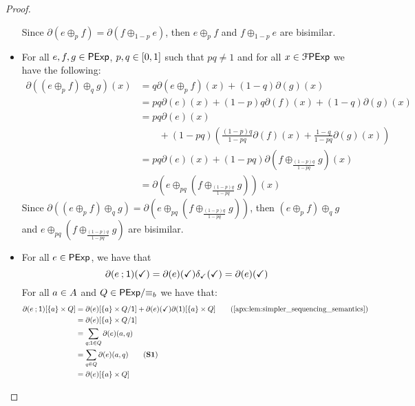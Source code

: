 \begin{proof}
\begin{itemize}[leftmargin=0em]
        Since $\partial(e \oplus_p f) = \partial(f \oplus_{1-p} e )$, then $e \oplus_p f$ and $f \oplus_{1-p} e$ are bisimilar.

        \item[] 
        For all $e,f,g  \in \mathsf{PExp}$, $p,q \in \interval{0}{1}$ such that $pq \neq 1$ and for all $x \in\mathcal{F} \mathsf{PExp}$ we have the following:
        \begin{align*}
            \partial\left((e \oplus_p f) \oplus_{q} g \right)(x) &= q\partial(e \oplus_p f)(x) + (1-q) \partial(g)(x) \\
            &=pq \partial(e)(x) + (1-p)q \partial(f)(x) + (1-q) \partial(g)(x)\\
            &=pq \partial(e)(x)\\ &\quad\quad+ (1-pq)\left(\frac{(1-p)q}{1-pq} \partial(f)(x) + \frac{1-q}{1-pq} \partial(g)(x)\right)\\
            &=pq \partial(e)(x) + (1-pq)\partial\left(f \oplus_{\frac{{(1-p)}q}{1-pq}}g \right)(x)\\
            &=\partial\left(e \oplus_{pq} \left( f \oplus_{\frac{{(1-p)}q}{1-pq}} g\right)\right)(x)
        \end{align*}
        Since $\partial\left((e \oplus_p f) \oplus_{q} g \right) = \partial\left(e \oplus_{pq} \left( f \oplus_{\frac{(1-p)q}{1-pq}} g\right)\right)$, then $(e \oplus_p f) \oplus_{q} g$ and $e \oplus_{pq} \left( f \oplus_{\frac{(1-p)q}{1-pq}} g\right)$ are bisimilar.

        \item[] 
        For all $e \in \mathsf{PExp}$, we have that
        $$\partial(e \mathbin{;} \mathsf{1})(\checkmark) = \partial(e)(\checkmark)\delta_{\checkmark}(\checkmark)=\partial(e)(\checkmark)$$
        For all $a \in {A}$ and $Q \in {\mathsf{PExp}}/{\equiv_b}$ we have that:
        \begin{align*}
            \partial(e \seq \one)[\{a\} \times Q] &= \partial(e)[\{a\} \times {Q}/{\one}] + \partial(e)(\checkmark)\partial(\one)[\{a\} \times Q] \tag{\Cref{apx:lem:simpler_sequencing_semantics}}\\
            &= \partial(e)[\{a\} \times {Q}/{\one}] \\
            &= \sum_{q \seq \one \in Q}\partial(e)(a,q) \\
            &= \sum_{q \in Q}\partial(e)(a,q) \tag{\textbf{S1}}\\
            &= \partial(e)[\{a\} \times Q]
        \end{align*}


\end{itemize}
\end{proof}
